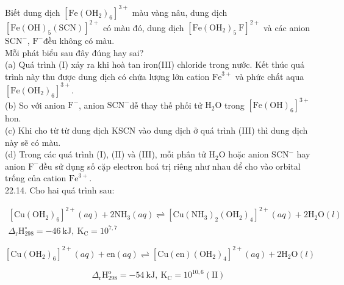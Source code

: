 \documentclass[10pt]{article}
\begin{document}
Biết dung dịch $\left[\mathrm{Fe}\left(\mathrm{OH}_{2}\right)_{6}\right]^{3+}$ màu vàng nâu, dung dịch $\left[\mathrm{Fe}(\mathrm{OH})_{5}(\mathrm{SCN})\right]^{2+}$ có màu đó, dung dịch $\left[\mathrm{Fe}\left(\mathrm{OH}_{2}\right)_{5} \mathrm{~F}\right]^{2+}$ và các anion $\mathrm{SCN}^{-}$, $\mathrm{F}^{-}$đều không có màu.\\
Mỗi phát biểu sau đây đúng hay sai?\\
(a) Quá trình (I) xảy ra khi hoà tan iron(III) chloride trong nước. Kết thúc quá trình này thu được dung dịch có chứa lượng lớn cation $\mathrm{Fe}^{3+}$ và phức chất aqua $\left[\mathrm{Fe}\left(\mathrm{OH}_{2}\right)_{6}\right]^{3+}$.\\
(b) So với anion $\mathrm{F}^{-}$, anion $\mathrm{SCN}^{-}$dễ thay thế phối tử $\mathrm{H}_{2} \mathrm{O}$ trong $\left[\mathrm{Fe}(\mathrm{OH})_{6}\right]^{3+}$ hon.\\
(c) Khi cho từ từ dung dịch KSCN vào dung dịch ở quá trình (III) thì dung dịch này sẽ có màu.\\
(d) Trong các quá trình (I), (II) và (III), mỗi phân tử $\mathrm{H}_{2} \mathrm{O}$ hoặc anion $\mathrm{SCN}^{-}$ hay anion $\mathrm{F}^{-}$đều sử dụng số cặp electron hoá trị riêng như nhau để cho vào orbital trống của cation $\mathrm{Fe}^{3+}$.\\
22.14. Cho hai quá trình sau:

\[
\begin{array}{r}
{\left[\mathrm{Cu}\left(\mathrm{OH}_{2}\right)_{6}\right]^{2+}(a q)+2 \mathrm{NH}_{3}(a q) \rightleftharpoons\left[\mathrm{Cu}\left(\mathrm{NH}_{3}\right)_{2}\left(\mathrm{OH}_{2}\right)_{4}\right]^{2+}(a q)+2 \mathrm{H}_{2} \mathrm{O}(l)} \\
\Delta_{\mathrm{r}} \mathrm{H}_{298}^{\circ}=-46 \mathrm{~kJ}, \mathrm{~K}_{\mathrm{C}}=10^{7,7} \tag{I}
\end{array}
\]

$\left[\mathrm{Cu}\left(\mathrm{OH}_{2}\right)_{6}\right]^{2+}(a q)+\mathrm{en}(a q) \rightleftharpoons\left[\mathrm{Cu}(\mathrm{en})\left(\mathrm{OH}_{2}\right)_{4}\right]^{2+}(a q)+2 \mathrm{H}_{2} \mathrm{O}(l)$

$$
\Delta_{\mathrm{r}} \mathrm{H}_{298}^{\mathrm{o}}=-54 \mathrm{~kJ}, \mathrm{~K}_{\mathrm{C}}=10^{10,6}(\mathrm{II})
$$
\end{document}
